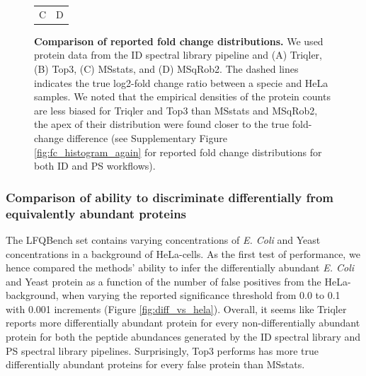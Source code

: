 \documentclass[10pt,letterpaper]{article}
\begin{document}
\begin{figure}[hbt]
\begin{tabular}{cc}
        C & D 
    \end{tabular}
    \caption{{\bf Comparison of reported fold change distributions.} We used protein data from the ID spectral library pipeline and (A) Triqler, (B) Top3, (C) MSstats, and (D) MSqRob2. The dashed lines indicates the true log2-fold change ratio between a specie and HeLa samples. We noted that the empirical densities of the protein counts are less biased for Triqler and Top3 than MSstats and MSqRob2, the apex of their distribution were found closer to the true fold-change difference (see Supplementary Figure \ref{fig:fc_histogram_again} for reported fold change distributions for both ID and PS workflows). \label{fig:fc_histogram}}
\end{figure}

\subsubsection*{Comparison of ability to discriminate differentially from equivalently abundant proteins}

The LFQBench set contains varying concentrations of {\em E. Coli} and Yeast concentrations in a background of HeLa-cells. As the first test of performance, we hence compared the methods' ability to infer the differentially abundant {\em E. Coli} and Yeast protein as a function of the number of false positives from the HeLa-background, when varying the reported significance threshold from 0.0 to 0.1 with 0.001 increments (Figure \ref{fig:diff_vs_hela}). Overall, it seems like Triqler reports more differentially abundant protein for every non-differentially abundant protein for both the peptide abundances generated by the ID spectral library and PS spectral library pipelines. Surprisingly, Top3 performs has more true differentially abundant proteins for every false protein than MSstats. 
\end{document}
